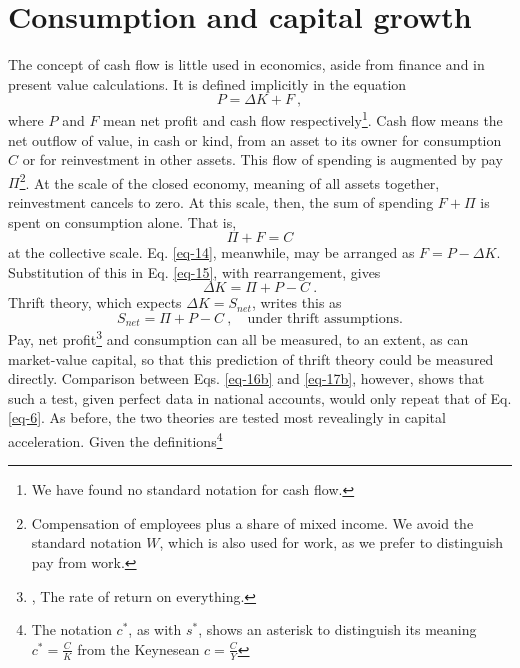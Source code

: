 \documentclass[a4paper,fleqn]{latex_styles/cas-sc}
\begin{document}
%

\FloatBarrier
%
\hypertarget{consumption-and-capital-growth}{%
\section{Consumption and capital growth}\label{consumption-and-capital-growth}}
%
The concept of cash flow is little used in economics, aside from finance and in present value calculations. It is defined implicitly in the equation
%
\begin{equation}
    P = \Delta K + F\ ,\label{eq-14}
\end{equation}
%
where \(P\) and \(F\) mean net profit and cash flow respectively\footnote{We have found no standard notation for cash flow.}. Cash flow means the net outflow of value, in cash or kind, from an asset to its owner for consumption \(C\) or for reinvestment in other assets. This flow of spending is augmented by pay \(\Pi\)\footnote{Compensation of employees plus a share of mixed income. We avoid the standard notation \(W\), which is also used for work, as we prefer to distinguish pay from work.}. At the scale of the closed economy, meaning of all assets together, reinvestment cancels to zero. At this scale, then, the sum of spending \(F + \Pi\) is spent on consumption alone. That is,
%
\begin{equation}
    \Pi + F = C \label{eq-15}
\end{equation}
%
at the collective scale.
Eq. \eqref{eq-14}, meanwhile, may be arranged as \(F = P - \Delta K\). Substitution of this in Eq. \eqref{eq-15}, with rearrangement, gives 
%
\begin{equation}
\Delta K = \Pi + P - C \ . \label{eq-16b}
\end{equation}
%
Thrift theory, which expects \(\Delta K = S_{net}\), writes this as
%
\begin{equation}
    S_{net} = \Pi + P - C\ ,\quad \text{under thrift assumptions.}\label{eq-17b}
\end{equation}
%
Pay, net profit\footnote{\cite{jorda2019}, The rate of return on everything.} and consumption can all be measured, to an extent, as can market-value capital, so that this prediction of thrift theory could be measured directly. Comparison between Eqs. \eqref{eq-16b} and \eqref{eq-17b}, however, shows that such a test, given perfect data in national accounts, would only repeat that of Eq. \eqref{eq-6}. As before, the two theories are tested most revealingly in capital acceleration. 
%
Given the definitions\footnote{The notation \(c^*\), as with \(s^*\), shows an asterisk to distinguish its meaning \(c^* = \frac{C}{K}\) from the Keynesean \(c = \frac{C}{Y}\)}
\end{document}

